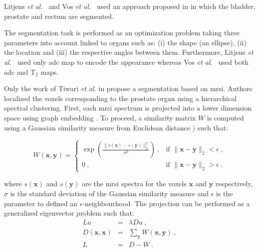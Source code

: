 \begin{enumerate}[leftmargin=*]
Litjens \textit{et al.}~\cite{Litjens2011} and Vos \textit{et al.}~\cite{Vos2012} used an approach proposed in \cite{Huisman2010} in which the bladder, prostate and rectum are segmented.

The segmentation task is performed as an optimization problem taking three parameters into account linked to organs such as: (i) the shape (an ellipse), (ii) the location and (iii) the respective angles between them.
Furthermore, Litjens \textit{et al.}~\cite{Litjens2011} used only \ac{adc} map to encode the appearance whereas Vos \textit{et al.}~\cite{Vos2012} used both \ac{adc} and T$_2$ maps.


Only the work of Tiwari \textit{et al.} in \cite{Tiwari2009} propose a segmentation based on \ac{mrsi}.
Authors localized the voxels corresponding to the prostate organ using a hierarchical spectral clustering.
First, each \ac{mrsi} spectrum is projected into a lower dimension space using graph embedding \cite{Shi2000}.
To proceed, a similarity matrix $W$ is computed using a Gaussian similarity measure from Euclidean distance \cite{Belkin2001}) such that:

\begin{equation}
	W(\mathbf{x},\mathbf{y}) =
	\begin{cases}	
	 	\exp \left( \frac{\| s(\mathbf{x}) - s(\mathbf{y}) \|_2^2}{\sigma^2} \right) \ , & \text{if } \| \mathbf{x} - \mathbf{y} \|_2 < \epsilon \ , \\
	 	0 \ , & \text{if } \| \mathbf{x} - \mathbf{y} \|_2 > \epsilon \ .
	 \end{cases}
	\label{eq:ge1}
\end{equation}

\noindent where $s(\mathbf{x})$ and $s(\mathbf{y})$ are the \ac{mrsi} spectra for the voxels $\mathbf{x}$ and $\mathbf{y}$ respectively, $\sigma$ is the standard deviation of the Gaussian similarity measure and $\epsilon$ is the parameter to defined an $\epsilon$-neighbourhood.
The projection can be performed as a generalized eigenvector problem such that:
\begin{eqnarray}
	Lu & = & \lambda D u \ , \nonumber \\
	D(\mathbf{x},\mathbf{x}) & = & \sum_{\mathbf{y}} W(\mathbf{x},\mathbf{y}) \ , \label{eq:ge2} \\
	L & = & D-W \ . \nonumber
\end{eqnarray}


\end{enumerate}
